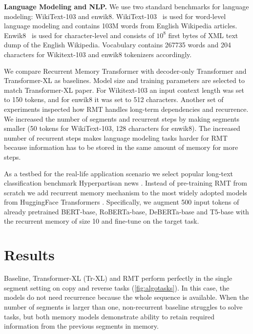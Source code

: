   \textbf{Language Modeling and NLP.} We use two standard benchmarks for language modeling: WikiText-103 and enwik8. WikiText-103~\cite{merity2017wikitext} is used for word-level language modeling and contains 103M words from English Wikipedia articles. Enwik8~\cite{enwik8} is used for character-level and consists of $10^8$ first bytes of XML text dump of the English Wikipedia. Vocabulary contains 267735 words and 204 characters for Wikitext-103 and enwik8 tokenizers accordingly.
  
  We compare Recurrent Memory Transformer with decoder-only Transformer and Transformer-XL as baselines. Model size and training parameters are selected to match Transformer-XL paper. For Wikitext-103 an input context length was set to 150 tokens, and for enwik8 it was set to 512 characters.
  Another set of experiments inspected how RMT handles long-term dependencies and recurrence. We increased the number of segments and recurrent steps by making segments smaller (50 tokens for WikiText-103, 128 characters for enwik8). The increased number of recurrent steps makes language modeling tasks harder for RMT because information has to be stored in the same amount of memory for more steps.
  
  As a testbed for the real-life application scenario we select popular long-text classification benchmark Hyperpartisan news \cite{kiesel2019semeval}. Instead of pre-training RMT from scratch we add recurrent memory mechanism to the most widely adopted models from HuggingFace Transformers \cite{wolf2020transformers}. Specifically, we augment 500 input tokens of already pretrained BERT-base, RoBERTa-base, DeBERTa-base and T5-base with the recurrent memory of size 10 and fine-tune on the target task.
  
  
  \section{Results}
  \label{results}
  Baseline, Transformer-XL (Tr-XL) and RMT perform perfectly in the single segment setting on copy and reverse tasks (\cref{fig:algotasks}). In this case, the models do not need recurrence because the whole sequence is available.
  When the number of segments is larger than one, non-recurrent baseline struggles to solve tasks, but both memory models demonstrate ability to retain required information from the previous segments in memory.
  
